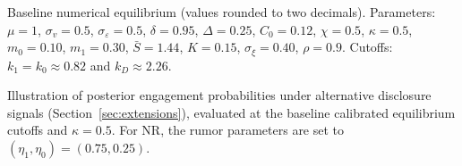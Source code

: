 \documentclass[11pt]{article}
\newcommand{\1}{\mathbf{1}}
\begin{document}

\setcounter{table}{0}
\renewcommand{\thetable}{\thesection.\arabic{table}}

\begin{table}[H]
\centering

\caption{Baseline numerical equilibrium (values rounded to two decimals). Parameters: $\mu=1$, $\sigma_v=0.5$, $\sigma_\varepsilon=0.5$, $\delta=0.95$, $\Delta=0.25$, $C_0=0.12$, $\chi=0.5$, $\kappa=0.5$, $m_0=0.10$, $m_1=0.30$, $\bar{S}=1.44$, $K=0.15$, $\sigma_\xi=0.40$, $\rho=0.9$. Cutoffs: $k_1=k_0\approx0.82$ and $k_D\approx2.26$.}
\label{tab:example}
\end{table}

\begin{table}[H]
\centering

\caption{Illustration of posterior engagement probabilities under alternative disclosure signals (Section~\ref{sec:extensions}), evaluated at the baseline calibrated equilibrium cutoffs and $\kappa=0.5$. For NR, the rumor parameters are set to $(\eta_1,\eta_0)=(0.75,0.25)$.}
\label{tab:disclosure-extensions}
\end{table}
\end{document}

